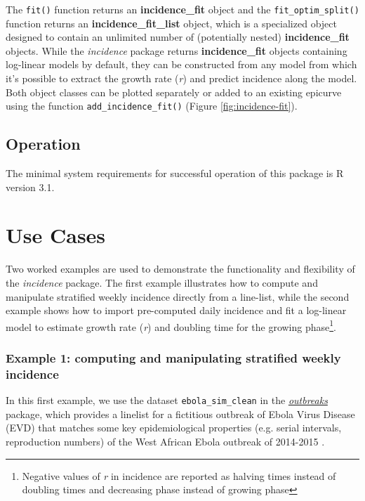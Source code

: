 \documentclass[9pt,a4paper]{extarticle}
\let\cite\citep
\begin{document}
The \texttt{fit()} function returns an \textbf{incidence\_fit} object and the \texttt{fit\_optim\_split()} function returns an \textbf{incidence\_fit\_list} object, which is a specialized object designed to contain an unlimited number of (potentially nested) \textbf{incidence\_fit} objects.
While the \textit{incidence} package returns \textbf{incidence\_fit} objects containing log-linear models by default, they can be constructed from any model from which it's possible to extract the growth rate (\emph{r}) and predict incidence along the model.
Both object classes can be plotted separately or added to an existing epicurve using the function \texttt{add\_incidence\_fit()} (Figure \ref{fig:incidence-fit}).

\subsection*{Operation}

The minimal system requirements for successful operation of this package is R version 3.1.

\section*{Use Cases}

Two worked examples are used to demonstrate the functionality and flexibility of the \textit{incidence} package.
The first example illustrates how to compute and manipulate stratified weekly incidence directly from a line-list, while the second example shows how to import pre-computed daily incidence and fit a log-linear model to estimate growth rate (\textit{r}) and doubling time for the growing phase\footnote{Negative values of \textit{r} in incidence are reported as halving times instead of doubling times and decreasing phase instead of growing phase}.

\subsubsection*{Example 1: computing and manipulating stratified weekly incidence}

In this first example, we use the dataset \texttt{ebola\_sim\_clean} in the \href{https://cran.r-project.org/web/packages/outbreaks/index.html}{\textit{outbreaks}} package, which provides a linelist for a fictitious outbreak of Ebola Virus Disease (EVD) that matches some key epidemiological properties (e.g. serial intervals, reproduction numbers) of the West African Ebola outbreak of 2014-2015 \cite{WHO_Ebola_Response_Team2014-mr}.
\end{document}

